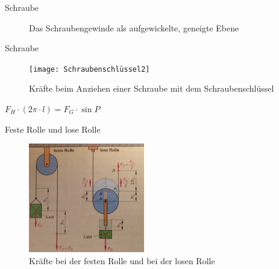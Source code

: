 \documentclass{beamer}
\begin{document}
{\begin{exampleblock}{Schraube}
\begin{figure}
	  \vspace{-3mm}
	  \caption{Das Schraubengewinde als aufgewickelte, geneigte Ebene}
   \end{figure}
\end{exampleblock} \newpage
\begin{exampleblock}{Schraube}
    \begin{figure}
	  \texttt{[image: Schraubenschlüssel2]}
	  \vspace{-3mm}
	  \caption{Kräfte beim Anziehen einer Schraube mit dem Schraubenschlüssel}
   \end{figure}
   $F_H\cdot (2\pi\cdot l)=F_G\cdot \sin P$
\end{exampleblock} \newpage
\begin{exampleblock}{Feste Rolle und lose Rolle}
    \begin{figure}
	  \includegraphics[width=0.45\textwidth]{Rolle}
	  \vspace{-3mm}
	  \caption{Kräfte bei der festen Rolle und bei der losen Rolle}
   \end{figure}
\end{exampleblock}
}
\end{document}
